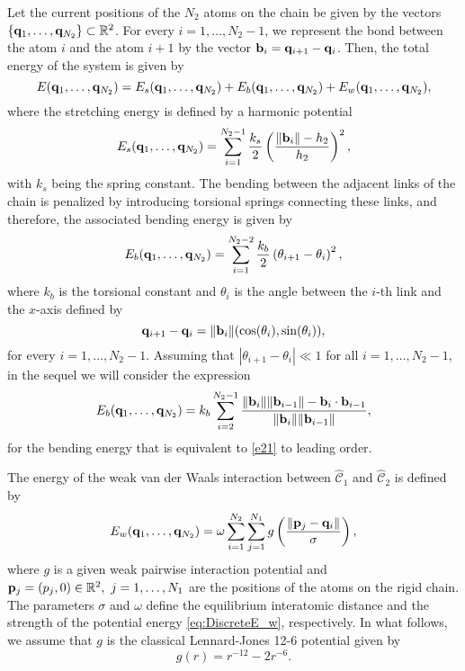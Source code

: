 \documentclass{siamltex}
\newcommand{\bq}{{\bf q}}
\newcommand{\bp}{{\bf p}}
\newcommand{\bb}{{\bf b}}
\begin{document}
Let the current positions of the $N_2$ atoms on the chain be given by the vectors $\left\{\bq_1,\dots, \bq_{N_2}\right\}\subset \mathbb{R}^{2}$. For every $i=1,\ldots,N_2-1$, we represent the bond between the atom $i$ and the atom $i+1$ by the vector $\bb_i = \bq_{i+1}-\bq_i$. Then, the total energy of the system is given by 
$$E({\bq_1,\ldots,\bq_{N_2}}) = E_s({\bq_1,\ldots,\bq_{N_2}})  + E_b({\bq_1,\ldots,\bq_{N_2}})  + E_w({\bq_1,\ldots,\bq_{N_2}}) ,$$
where the stretching energy is defined by a harmonic potential
\begin{equation}\label{eq:DiscreteE_s}
E_s({\bq_1,\ldots,\bq_{N_2}})  = \sum_{i=1}^{N_2-1} \frac{k_s}{2}\left( \frac{\|\bb_i\|-h_2}{h_2}\right)^2, 
\end{equation}
with $k_s$ being the spring constant. The bending between the adjacent links of the chain is penalized by introducing torsional springs connecting these links, and therefore, the associated bending energy is given by
\begin{equation}
  E_{b}({\bq_1,\ldots,\bq_{N_2}}) 
  =
  \sum_{i=1}^{N_2-2} \frac{k_b}{2}
  \left(\theta_{i+1}-\theta_i\right)^2, \label{e21}
\end{equation}
where $k_b$ is the torsional constant and $\theta_i$ is the angle between the $i$-th link and the $x$-axis defined by 
\[\bq_{i+1} - \bq_{i} =  \|\bb_{i}\| (\cos(\theta_i), \sin (\theta_i)),\] 
for every $i=1,\ldots,N_2-1$. Assuming that $\left|\theta_{i+1}-\theta_i\right|\ll1$ for all $i=1,\ldots,N_2-1$, in the sequel we will consider the expression 
\begin{equation}
  E_{b}({\bq_1,\ldots,\bq_{N_2}}) 
  =
  k_b\sum_{i=2}^{N_2-1} 
  \frac{\|\bb_i\|\|\bb_{i-1}\|-\bb_i\cdot\bb_{i-1}}{\|\bb_{i}\|\|\bb_{i-1}\|}, \label{e21.5}
\end{equation}
 for the bending energy that is equivalent to \eqref{e21} to leading order.

The energy of the weak van der Waals interaction between $\hat{\mathcal C}_1$ and $\hat{\mathcal C}_2$ is defined by
\begin{equation}\label{eq:DiscreteE_w}
  E_w({\bq_1,\ldots,\bq_{N_2}}) 
  =
  \omega\sum_{i=1}^{N_2} \sum_{j=1}^{N_1} g\left(\frac{\|\bp_j - \bq_i \|}{\sigma}\right),
\end{equation}  
where $g$ is a given weak pairwise interaction potential and $\bp_j=(p_j,0)\in\mathbb R^2,\ j=1,\ldots,N_1$ are the positions of the atoms on the rigid chain.  The parameters $\sigma$ and $\omega$ define the equilibrium interatomic distance and the strength of the potential energy \eqref{eq:DiscreteE_w}, respectively. In what follows, we assume that $g$ is the classical Lennard-Jones 12-6 potential given by
$$g(r) = r^{-12}-2r^{-6}.$$ 
\end{document}

